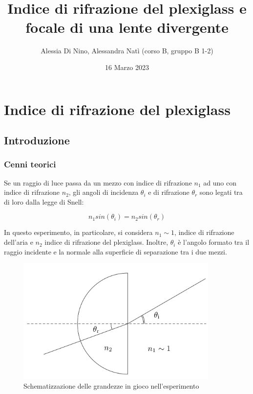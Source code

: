 \documentclass{article}
\begin{document}
\title{Indice di rifrazione del plexiglass e focale di una lente divergente}
\author{Alessia Di Nino, Alessandra Natì (corso B, gruppo B 1-2)}
\date{16 Marzo 2023}
\maketitle

\section{Indice di rifrazione del plexiglass}

\vspace{1em}

\subsection{Introduzione}
\subsubsection{Cenni teorici} %
Se un raggio di luce passa da un mezzo con indice di rifrazione $n_1$ ad uno con
indice di rifrazione $n_2$, gli angoli di incidenza $\theta_i$ e di rifrazione $\theta_r$ sono legati tra di
loro dalla legge di Snell: 

\begin{equation}
    n_1sin(\theta_i)=n_2sin(\theta_r)
\end{equation}

In questo esperimento, in particolare, si considera $n_1 \sim 1$, indice di rifrazione dell'aria e $n_2$ indice di rifrazione del plexiglass. Inoltre, $\theta_i$ è l'angolo formato tra il raggio incidente e la normale alla superficie di separazione tra i due mezzi.
\begin{figure} [H]
    \centering
    \includegraphics[width=10cm]{schema_lenti(1).png}
    \caption{Schematizzazione delle grandezze in gioco nell'esperimento}
    \label{fig:my_label}
\end{figure}
\end{document}

